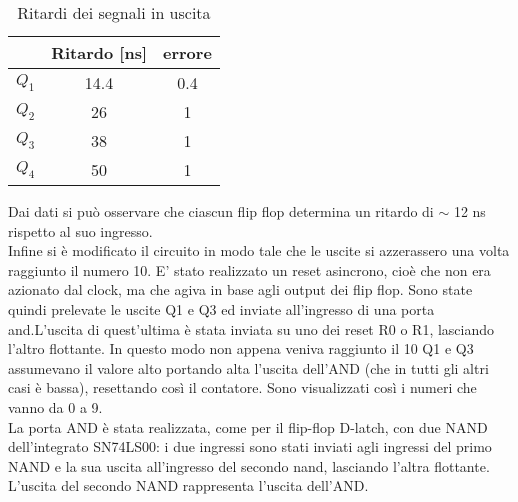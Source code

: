 \begin{table}[h]
	\centering
	\begin{tabular}{ccc }
		
		 & Ritardo [ns]& errore\\
		 \midrule 
		  $Q_{1}$ & 14.4 & 0.4 \\
		  $Q_{2}$ & 26 & 1 \\
		  $Q_{3}$ & 38 & 1 \\
          $Q_{4}$ & 50 & 1 \\
 	\end{tabular}
	\caption{ Ritardi dei segnali in uscita }
	\label{t:Ritardi}
\end{table}
Dai dati si può osservare che ciascun flip flop determina un ritardo di $\sim$ 12 ns rispetto al suo ingresso.\\
Infine si è modificato il circuito in modo tale che le uscite si azzerassero una volta raggiunto il numero 10. E' stato realizzato un reset asincrono, cioè che non era azionato dal clock, ma che agiva in base agli output dei flip flop. Sono state quindi prelevate le uscite Q1 e Q3 ed inviate all'ingresso di una porta and.L'uscita di quest'ultima è stata inviata su uno dei reset R0 o R1, lasciando l'altro flottante. In questo modo non appena veniva raggiunto il 10 Q1 e Q3 assumevano il valore alto portando alta l'uscita dell'AND (che in tutti gli altri casi è bassa), resettando così il contatore. Sono visualizzati così i numeri che vanno da 0 a 9.\\
La porta AND è stata realizzata, come per il flip-flop D-latch, con due NAND dell'integrato SN74LS00: i due ingressi sono stati inviati agli ingressi del primo NAND e la sua uscita all'ingresso del secondo nand, lasciando l'altra flottante. L'uscita del secondo NAND rappresenta l'uscita dell'AND.